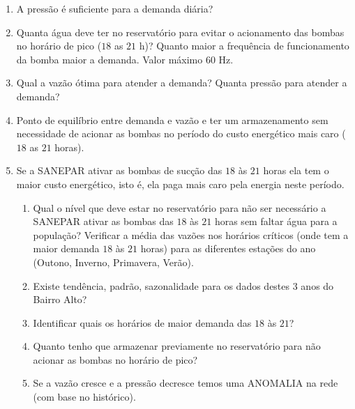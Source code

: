 \begin{enumerate}[start=1, label={\textbf{Q} \arabic*}]
	\item \label{q1}  A pressão é suficiente para a demanda diária? 
	\item \label{q2} Quanta água deve ter no reservatório para evitar o acionamento das bombas no horário de pico ($18$ as $21$ h)? Quanto maior a frequência de funcionamento da bomba maior a demanda. Valor máximo $ 60 $ Hz. 
	\item \label{q3} Qual a vazão ótima para atender a demanda? Quanta pressão para atender a demanda? 
	\item \label{q4} Ponto de equilíbrio entre demanda e vazão e ter um armazenamento sem necessidade de acionar as bombas no período do custo energético mais caro ($18$ as $21$ horas).
	\item \label{q5} Se a SANEPAR ativar as bombas de sucção das $18$ às $21$ horas ela tem o maior custo energético, isto é, ela paga mais caro pela energia neste período.	
	 
	\begin{enumerate}[label=\alph*.]
	\item \label{q5:a} Qual o nível que deve estar no reservatório para não ser necessário a SANEPAR ativar as bombas das $18$ às $21$ horas sem faltar água para a população?
	Verificar a média das vazões nos horários críticos (onde tem a maior demanda $18$ às $21$ horas) para as diferentes estações do ano (Outono, Inverno, Primavera, Verão). 
	\item \label{q5:b} Existe tendência, padrão, sazonalidade para os dados destes 3 anos do Bairro Alto?
	\item \label{q5:c}Identificar quais os horários de maior demanda das $18$ às $21$?
	\item \label{q5:d} Quanto tenho que armazenar previamente no reservatório para não acionar as bombas no horário de pico?
	\item \label{q5:e} Se a vazão cresce e a pressão decresce temos uma ANOMALIA na rede (com base no histórico).	
	\end{enumerate}
\end{enumerate}
